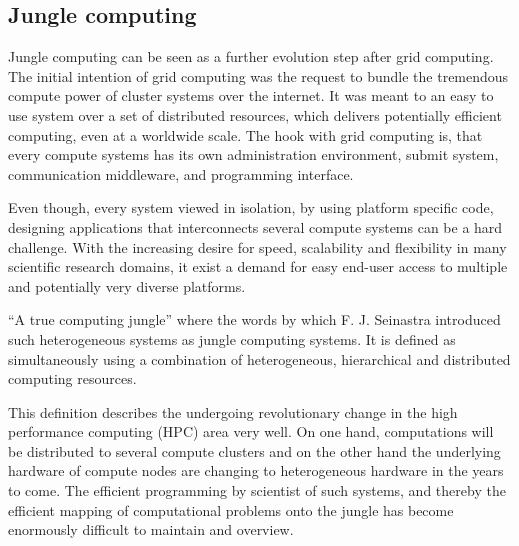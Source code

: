 \subsection{Jungle computing}
\label{sec:jungle}
Jungle computing can be seen as a further evolution step after grid
computing. The initial intention of grid computing was the request to
bundle the tremendous compute power of cluster systems over the
internet\cite{ref:grid}. It was meant to an easy to use system over a
set of distributed resources, which delivers potentially efficient
computing, even at a worldwide scale.  The hook with grid computing
is, that every compute systems has its own administration environment,
submit system, communication middleware, and programming interface.

Even though, every system viewed in isolation, by using platform
specific code, designing applications that interconnects several
compute systems can be a hard challenge.  With the increasing desire
for speed, scalability and flexibility in many scientific research
domains, it exist a demand for easy end-user access to multiple and
potentially very diverse platforms.

``A true computing jungle'' where the words by which F. J. Seinastra
introduced such heterogeneous systems as jungle computing
systems\cite{ref:jungle}. It is defined as simultaneously using a
combination of heterogeneous, hierarchical and distributed computing
resources.

This definition describes the undergoing revolutionary change in the
high performance computing (HPC) area very well. On one hand,
computations will be distributed to several compute clusters and on
the other hand the underlying hardware of compute nodes are changing
to heterogeneous hardware in the years to come. The efficient
programming by scientist of such systems, and thereby the efficient
mapping of computational problems onto the jungle has become
enormously difficult to maintain and overview.


